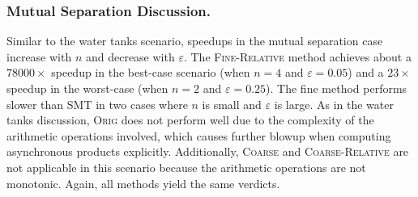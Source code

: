 \subsubsection{Mutual Separation Discussion.}
Similar to the water tanks scenario, speedups in the mutual separation case increase with \(n\) and decrease with \(\varepsilon\).
The \textsc{Fine-Relative} method achieves about a $78000\times$ speedup in the best-case scenario (when \(n=4\) and \(\varepsilon=0.05\)) and a $23\times$ speedup in the worst-case (when \(n=2\) and \(\varepsilon=0.25\)).
The fine method performs slower than SMT in two cases where \(n\) is small and \(\varepsilon\) is large.
As in the water tanks discussion, \textsc{Orig} does not perform well due to the complexity of the arithmetic operations involved, which causes further blowup when computing asynchronous products explicitly.
Additionally, \textsc{Coarse} and \textsc{Coarse-Relative} are not applicable in this scenario because the arithmetic operations are not monotonic.
Again, all methods yield the same verdicts.

